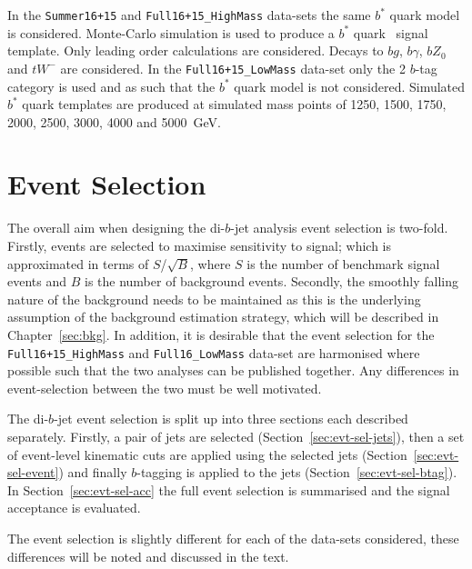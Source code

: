 \begin{itemize}[leftmargin=*]
  In the \verb|Summer16+15| and \verb|Full16+15_HighMass|
  data-sets the same $b^*$ quark model is considered.
  Monte-Carlo simulation is used to produce a $b^*$ quark \mjj~signal template.
  Only leading order calculations are considered.
  Decays to $bg$, $b\gamma$, $bZ_0$ and $tW^{-}$ are considered.
  In the \verb|Full16+15_LowMass| data-set
  only the 2 $b$-tag category is used
  and as such that the $b^*$ quark model is not considered.
  Simulated $b^*$ quark templates are produced at simulated mass points of
  1250, 1500, 1750, 2000, 2500, 3000, 4000 and 5000~GeV.
\end{itemize}

\section{Event Selection}
\label{sec:evt-sel}

The overall aim when designing the di-$b$-jet analysis event selection
is two-fold.
Firstly, events are selected to
maximise sensitivity to signal;
which is approximated in terms of $S$/$\sqrt{B}$,
where $S$ is the number of benchmark signal events and $B$ is the number of background events.
Secondly, the smoothly falling nature of the background needs to be maintained
as this is the underlying assumption of the background estimation strategy,
which will be described in Chapter~\ref{sec:bkg}.
In addition, it is desirable that the event selection for the
\verb|Full16+15_HighMass| and \verb|Full16_LowMass| data-set are
harmonised where possible such that the two analyses can be published together.
Any differences in event-selection between the two must be well motivated.

The di-$b$-jet event selection is split up into three sections each described separately.
Firstly, a pair of jets are selected (Section~\ref{sec:evt-sel-jets}),
then a set of event-level kinematic cuts are applied using the selected jets (Section~\ref{sec:evt-sel-event})
and finally $b$-tagging is applied to the jets (Section~\ref{sec:evt-sel-btag}).
In Section~\ref{sec:evt-sel-acc} the full event selection is summarised and
the signal acceptance is evaluated.

The event selection is slightly different for each of the data-sets considered,
these differences will be noted and discussed in the text.


